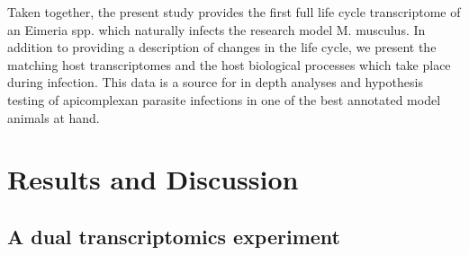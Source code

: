 \documentclass{bmcart}
\begin{document}
Taken together, the present study provides the first full life cycle transcriptome of an Eimeria spp. which naturally infects the research model M. musculus. In addition to providing a description of changes in the life cycle, we present the matching host transcriptomes and the host biological processes which take place during infection. This data is a source for in depth analyses and hypothesis testing of apicomplexan parasite infections in one of the best annotated model animals at hand. 


\section*{Results and Discussion}


\subsection*{A dual transcriptomics experiment}
\end{document}
